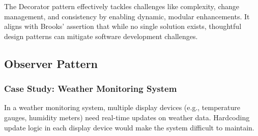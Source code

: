 \documentclass[11pt]{article}
\begin{document}
The Decorator pattern effectively tackles challenges like complexity, change management, and consistency by enabling dynamic, modular enhancements. It aligns with Brooks’ assertion that while no single solution exists, thoughtful design patterns can mitigate software development challenges.

\subsection{Observer Pattern}

\subsubsection{Case Study: Weather Monitoring System}
In a weather monitoring system, multiple display devices (e.g., temperature gauges, humidity meters) need real-time updates on weather data. Hardcoding update logic in each display device would make the system difficult to maintain.
\end{document}
